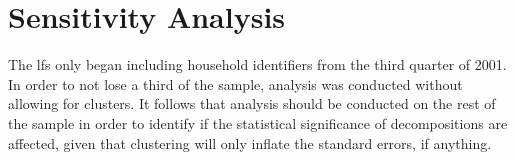 \documentclass[class=article, crop=false]{standalone}
\begin{document}
\section{Sensitivity Analysis}
\label{sec:sensitivity}
The \acrshort{lfs} only began including household identifiers from the third quarter of 2001. In order to not lose a third of the sample, analysis was conducted without allowing for clusters. It follows that analysis should be conducted on the rest of the sample in order to identify if the statistical significance of decompositions are affected, given that clustering will only inflate the standard errors, if anything.



\ifstandalone

\fi
\end{document}
